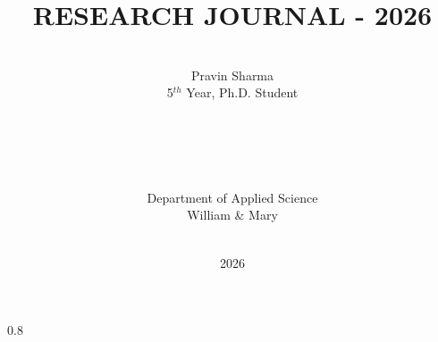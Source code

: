 \documentclass[11pt,twoside]{report}
\title{\Huge{ RESEARCH JOURNAL - 2026}}
\author{\\ \LARGE{Pravin Sharma}
\\ 5$^{th}$ Year, Ph.D. Student
\\ 
\\
\vspace{6.5cm}
\\
\\
\\
\\ Department of Applied Science \\ William \& Mary
\\
\\ 
}
\date{\Huge{2026}}
\begin{document}
\sloppy
\thispagestyle{headings}
\maketitle


{}
% 

\cleardoublepage

\newpage
\tableofcontents
\thispagestyle{plain}

\newpage
{}


\newpage

\setcounter{section}{0}


% 
% 


% 
% 
% 
% 
% 
% 
% 
% 
% 
% 
% 
% 

\newpage
\begin{spacing}{0.8}
	\renewcommand{\bibname}{\bf{References}}
	
	
\end{spacing}
\end{document}
